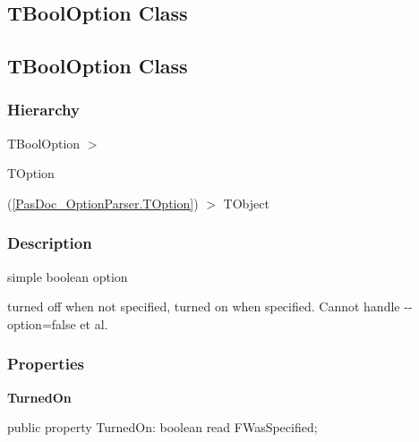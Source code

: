 \documentclass{report}
\newif\ifpdf
\begin{document}
\subsection*{\large{\textbf{TBoolOption Class}}\normalsize\hspace{1ex}\hrulefill}
\else
\subsection*{TBoolOption Class}
\fi
\label{PasDoc_OptionParser.TBoolOption}
\subsubsection*{\large{\textbf{Hierarchy}}\normalsize\hspace{1ex}\hfill}
TBoolOption {$>$} \begin{ttfamily}TOption\end{ttfamily}(\ref{PasDoc_OptionParser.TOption}) {$>$} 
TObject
\subsubsection*{\large{\textbf{Description}}\normalsize\hspace{1ex}\hfill}
simple boolean option\hfill\vspace*{1ex}

 turned off when not specified, turned on when specified. Cannot handle {-}{-}option=false et al.\subsubsection*{\large{\textbf{Properties}}\normalsize\hspace{1ex}\hfill}
\begin{list}{}{
\setlength{\itemindent}{0cm}
\setlength{\listparindent}{0cm}
\setlength{\leftmargin}{\evensidemargin}
\addtolength{\leftmargin}{\tmplength}
\settowidth{\labelsep}{X}
\addtolength{\leftmargin}{\labelsep}
\setlength{\labelwidth}{\tmplength}
}
\label{PasDoc_OptionParser.TBoolOption-TurnedOn}
\item[\textbf{TurnedOn}\hfill]
\ifpdf
\begin{flushleft}
\fi
\begin{ttfamily}
public property TurnedOn: boolean read FWasSpecified;\end{ttfamily}

\ifpdf
\end{flushleft}
\fi


\par  \end{list}
\end{document}
